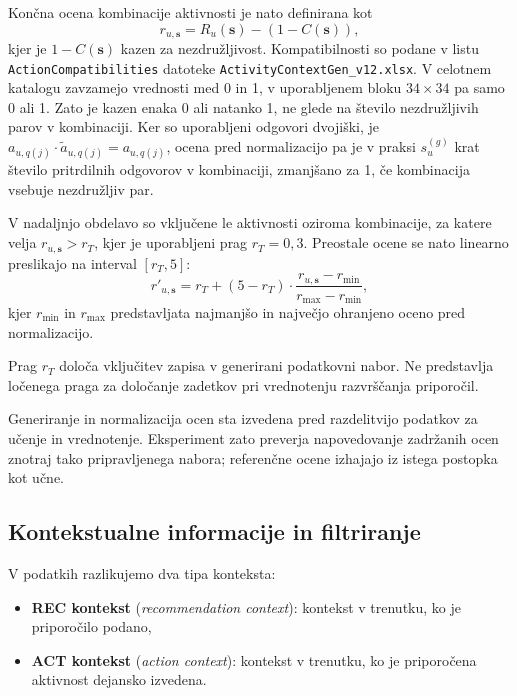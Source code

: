 \documentclass[a4paper,twoside,openright,12pt,slovene]{book}
\begin{document}
Končna ocena kombinacije aktivnosti je nato definirana kot
\begin{equation}
r_{u,\mathbf{s}} = R_u(\mathbf{s}) - \left( 1 - C(\mathbf{s}) \right),
\end{equation}
kjer je $1 - C(\mathbf{s})$ kazen za nezdružljivost. Kompatibilnosti
so podane v listu \texttt{ActionCompatibilities} datoteke
\texttt{ActivityContextGen\_v12.xlsx}. V celotnem katalogu zavzamejo
vrednosti med 0 in 1, v uporabljenem bloku $34 \times 34$ pa samo 0 ali 1.
Zato je kazen enaka 0 ali natanko 1, ne glede na število nezdružljivih
parov v kombinaciji. Ker so uporabljeni odgovori dvojiški, je
$a_{u,q(j)} \cdot \tilde{a}_{u,q(j)} = a_{u,q(j)}$, ocena pred normalizacijo
pa je v praksi $s_u^{(g)}$ krat število pritrdilnih odgovorov v kombinaciji,
zmanjšano za 1, če kombinacija vsebuje nezdružljiv par.

V nadaljnjo obdelavo so vključene le aktivnosti oziroma kombinacije, za katere velja
$r_{u,\mathbf{s}} > r_T$, kjer je uporabljeni prag $r_T=0{,}3$. Preostale
ocene se nato linearno preslikajo na interval $[r_T, 5]$:
\begin{equation}
r'_{u,\mathbf{s}} =
r_T + (5 - r_T)\cdot
\frac{r_{u,\mathbf{s}} - r_{\min}}{r_{\max} - r_{\min}},
\end{equation}
kjer $r_{\min}$ in $r_{\max}$ predstavljata najmanjšo in največjo ohranjeno oceno pred normalizacijo.

Prag $r_T$ določa vključitev zapisa v generirani podatkovni nabor.
Ne predstavlja ločenega praga za določanje zadetkov pri vrednotenju
razvrščanja priporočil.

Generiranje in normalizacija ocen sta izvedena pred razdelitvijo
podatkov za učenje in vrednotenje. Eksperiment zato preverja
napovedovanje zadržanih ocen znotraj tako pripravljenega nabora;
referenčne ocene izhajajo iz istega postopka kot učne.


\subsection{Kontekstualne informacije in filtriranje}
\label{sec:rec_vs_act}

V podatkih razlikujemo dva tipa konteksta:
\begin{itemize}
    \item \textbf{REC kontekst} (\textit{recommendation context}): kontekst v trenutku, ko je priporočilo podano,
    \item \textbf{ACT kontekst} (\textit{action context}): kontekst v trenutku, ko je priporočena aktivnost dejansko izvedena.
\end{itemize}
\end{document}
